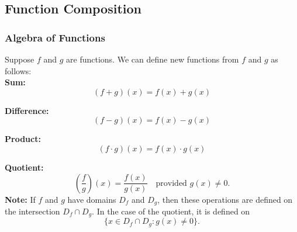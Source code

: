 \documentclass{beamer}
\begin{document}
\subsection{Function Composition}
\begin{frame}
  \frametitle{Algebra of Functions} 
    Suppose \(f\) and \(g\) are functions. We can define new functions from \(f\) and \(g\) as follows: \\
  
  \pause
    \textbf{Sum:}  
    \[
    (f+g)(x) = f(x) + g(x)
    \]
    
    \pause
    \textbf{Difference:}  
    \[
    (f-g)(x) = f(x) - g(x)
    \]
    
    \pause
    \textbf{Product:}  
    \[
    (f\cdot g)(x) = f(x) \cdot g(x)
    \]
    
    \pause
    \textbf{Quotient:}  
    \[
    \left(\frac{f}{g}\right)(x) = \frac{f(x)}{g(x)} \quad \text{provided } g(x) \neq 0.
    \]
    \textbf{Note:} If \(f\) and \(g\) have domains \(D_f\) and \(D_g\), then these operations are defined on the intersection \(D_f \cap D_g\). In the case of the quotient, it is defined on
    \[
    \{x \in D_f \cap D_g : g(x) \neq 0\}.
    \]
    
  \end{frame}
\end{document}
